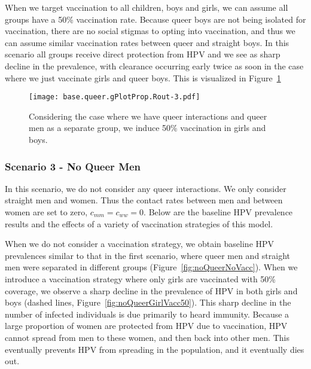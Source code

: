 \documentclass[12pt]{article}
\begin{document}
When we target vaccination to all children, boys and girls, we can assume all groups have a 50\% vaccination rate.  Because queer boys are not being isolated for vaccination, there are no social stigmas to opting into vaccination, and thus we can assume similar vaccination rates between queer and straight boys.  In this scenario all groups receive direct protection from HPV and we see as sharp decline in the prevalence, with clearance occurring early twice as soon in the case where we just vaccinate girls and queer boys.  This is visualized in Figure~\ref{queerVaccAll}

\begin{figure}[h!]
\begin{center}
\texttt{[image: base.queer.gPlotProp.Rout-3.pdf]}
\caption{Considering the case where we have queer interactions and queer men as a separate group, we induce 50\% vaccination in girls and boys.}
\label{queerVaccAll}
\end{center}
\end{figure}





\newpage
\subsubsection{Scenario 3 - No Queer Men}

In this scenario, we do not consider any queer interactions.  We only consider straight men and women.  Thus the contact rates between men and between women are set to zero, $c_{mm} = c_{ww} = 0$.  Below are the baseline HPV prevalence results and the effects of a variety of vaccination strategies of this model. 

When we do not consider a vaccination strategy, we obtain baseline HPV prevalences similar to that in the first scenario, where queer men and straight men were separated in different groups (Figure~\ref{fig:noQueerNoVacc}).  When we introduce a vaccination strategy where only girls are vaccinated with 50\% coverage, we observe a sharp decline in the prevalence of HPV in both girls and boys (dashed lines, Figure~\ref{fig:noQueerGirlVacc50}).  This sharp decline in the number of infected individuals is due primarily to heard immunity.  Because a large proportion of women are protected from HPV due to vaccination, HPV cannot spread from men to these women, and then back into other men.  This eventually prevents HPV from spreading in the population, and it eventually dies out. 
\end{document}
